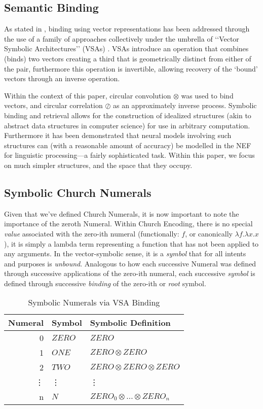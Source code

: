\documentclass{report}
\begin{document}
\subsection{Semantic Binding}

As stated in \cite{stewart2011a}, binding using vector representations has been addressed through the use of a family of approaches  collectively under the umbrella of \lq\lq{}Vector Symbolic Architectures\rq\rq{} (VSAs) \cite{Gayler2003}.
VSAs introduce an operation that combines (binds) two vectors creating a third that is geometrically distinct from either of the pair, furthermore this operation is invertible, allowing recovery of the \lq{}bound\rq{} vectors through an inverse operation.

Within the context of this paper, circular convolution $\otimes$ was used to bind vectors, and circular correlation $\oslash$ as an approximately inverse process.
Symbolic binding and retrieval allows for the construction of idealized structures (akin to abstract data structures in computer science) for use in arbitrary computation.
Furthermore it has been demonstrated that neural models involving such structures can (with a reasonable amount of accuracy) be modelled in the NEF for linguistic processing---a fairly sophisticated task.
Within this paper, we focus on much simpler structures, and the space that they occupy.

\subsection{Symbolic Church Numerals}

Given that we\rq{}ve defined Church Numerals, it is now important to note the importance of the zeroth Numeral.
Within Church Encoding, there is no special \emph{value} associated with the zero-ith numeral (functionally: $f$, or canonically $\lambda f.\lambda x.x$), it is simply a lambda term representing a function that has not been applied to any arguments.
In the vector-symbolic sense, it is a \emph{symbol} that for all intents and purposes is \emph{unbound}.
Analogous to how each successive Numeral was defined through successive applications of the zero-ith numeral, each successive \emph{symbol} is defined through successive \emph{binding} of the zero-ith or \emph{root} symbol.

\begin{table}[H]
\centering
\begin{tabular}{ r l l }
	Numeral	& Symbol	& Symbolic Definition\\ \hline
	0			& $ZERO$	& $ZERO$\\
	1			& $ONE$	& $ZERO\otimes ZERO$\\
	2			& $TWO$	& $ZERO\otimes ZERO\otimes ZERO$\\
	\vdots 		& \vdots 	& \vdots\\
	n 			& $N$ 		& $ZERO_0\otimes \ldots \otimes ZERO_{n}$\\
\end{tabular}
\caption{Symbolic Numerals via VSA Binding}
\label{tab:symbolic_numerals}
\end{table}
\end{document}
